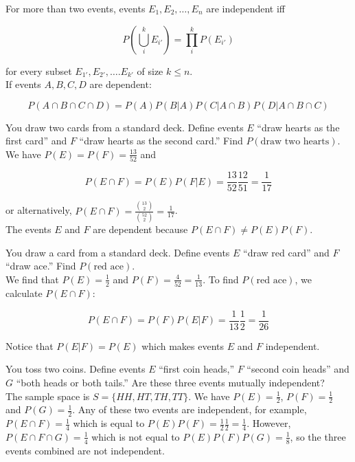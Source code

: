 For more than two events, events $E_1, E_2, \dots, E_n$ are independent iff

$$P\left(\bigcup_i^k E_{i'} \right) = \prod_i^k P(E_{i'})$$

for every subset $E_{1'}, E_{2'}, \dots. E_{k'}$ of size $k\le n$. \\

If events $A,B,C,D$ are dependent:

$$P(A\cap B\cap C\cap D) = P(A)P(B|A)P(C|A\cap B)P(D|A\cap B\cap C)$$

\begin{texample}
	You draw two cards from a standard deck. Define events $E$ ``draw hearts as the first card'' and $F$ ``draw hearts as the second card.'' Find $P(\text{draw two hearts})$. \\
	
	We have $P(E)=P(F)=\frac{13}{52}$ and
	
	$$P(E \cap F)=P(E)P(F|E)=\frac{13}{52}\frac{12}{51}=\frac{1}{17}$$
	
	or alternatively, $P(E \cap F)=\frac{{13 \choose 2}}{{52 \choose 2}}=\frac{1}{17}$. \\
	
	The events $E$ and $F$ are dependent because $P(E \cap F) \ne P(E)P(F)$.
\end{texample}

\begin{texample}
	You draw a card from a standard deck. Define events $E$ ``draw red card'' and $F$ ``draw ace.'' Find $P(\text{red ace})$. \\
	
	We find that $P(E)=\frac{1}{2}$ and $P(F)=\frac{4}{52}=\frac{1}{13}$. To find $P(\text{red ace})$, we calculate $P(E \cap F)$:
	
	$$P(E \cap F)=P(F)P(E|F)=\frac{1}{13}\frac{1}{2}=\frac{1}{26}$$
	
	Notice that $P(E|F)=P(E)$ which makes events $E$ and $F$ independent.
\end{texample}

\begin{texample}
	You toss two coins. Define events $E$ ``first coin heads,'' $F$ ``second coin heads'' and $G$ ``both heads or both tails.'' Are these three events mutually independent? \\
	
	The sample space is $S=\{HH, HT, TH, TT\}$. We have $P(E)=\frac12$, $P(F)=\frac12$ and $P(G)=\frac12$. Any of these two events are independent, for example, $P(E\cap F)=\frac14$ which is equal to $P(E)P(F)=\frac12\frac12=\frac14$. However, $P(E \cap F \cap G)=\frac14$ which is not equal to $P(E)P(F)P(G)=\frac18$, so the three events combined are not independent.
\end{texample}

